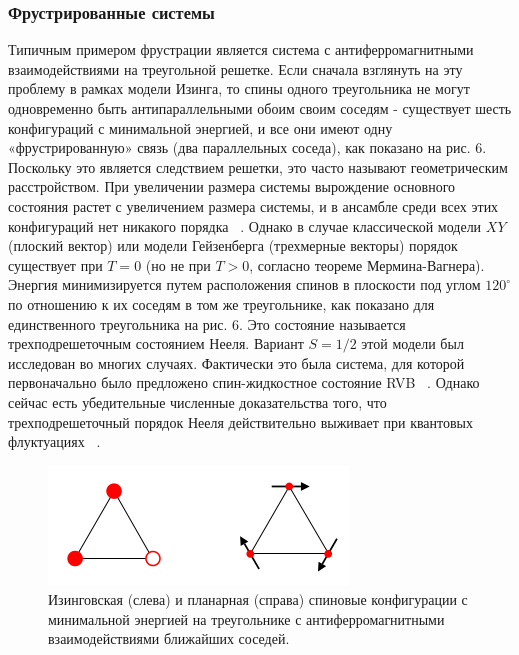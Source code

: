 \documentclass[11pt]{article}
\begin{document}
\subsubsection{Фрустрированные системы}
Типичным примером фрустрации является система с антиферромагнитными взаимодействиями на треугольной решетке. Если сначала взглянуть на эту проблему в рамках модели Изинга, то спины одного треугольника не могут одновременно быть антипараллельными обоим своим соседям - существует шесть конфигураций с минимальной энергией, и все они имеют одну «фрустрированную» связь (два параллельных соседа), как показано на рис. 6. Поскольку это является следствием решетки, это часто называют геометрическим расстройством. При увеличении размера системы вырождение основного состояния растет с увеличением размера системы, и в ансамбле среди всех этих конфигураций нет никакого порядка ~\cite{mp_11_413, mg_15_L631}. Однако в случае классической модели $XY$ (плоский вектор) или модели Гейзенберга (трехмерные векторы) порядок существует при $T = 0$ (но не при $T> 0$, согласно теореме Мермина-Вагнера).
Энергия минимизируется путем расположения спинов в плоскости под углом $120^\circ $ по отношению к их соседям в том же треугольнике, как показано для единственного треугольника на рис. 6. Это состояние называется трехподрешеточным состоянием Нееля. Вариант $S = 1/2$ этой модели был исследован во многих случаях. Фактически это была система, для которой первоначально было предложено спин-жидкостное состояние RVB ~\cite{pm_30_23}. Однако сейчас есть убедительные численные доказательства того, что трехподрешеточный порядок Нееля действительно выживает при квантовых флуктуациях ~\cite{prb_50_10048, prl_99_127004}.

\begin{figure}[htp]
\centering
\includegraphics[scale=0.5]{fig6}
\caption{Изинговская (слева) и планарная (справа) спиновые конфигурации с минимальной энергией на треугольнике с антиферромагнитными взаимодействиями ближайших соседей.}
\label{}
\end{figure}
\end{document}
